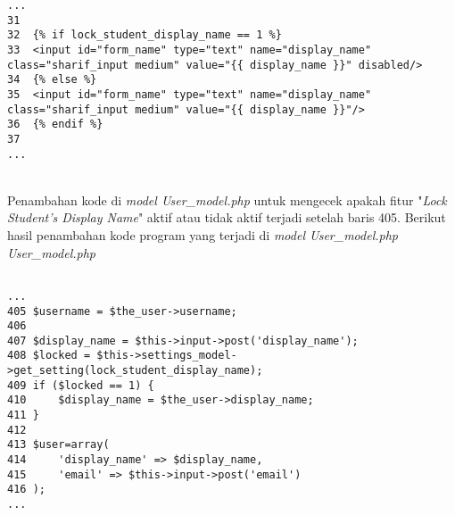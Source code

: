 \begin{lstlisting}[basicstyle=\ttfamily, frame=single,
columns=fullflexible, keepspaces=true, breaklines=true]
...
31
32	{% if lock_student_display_name == 1 %}
33	<input id="form_name" type="text" name="display_name" class="sharif_input medium" value="{{ display_name }}" disabled/>
34	{% else %}
35	<input id="form_name" type="text" name="display_name" class="sharif_input medium" value="{{ display_name }}"/>
36	{% endif %}
37
...
\end{lstlisting}
~\\
Penambahan kode di \textit{model User\_model.php} untuk mengecek apakah fitur "\textit{Lock Student's Display Name}" aktif atau tidak aktif terjadi setelah baris 405. Berikut hasil penambahan kode program yang terjadi di \textit{model User\_model.php}
\textit{User\_model.php}
\begin{lstlisting}[basicstyle=\ttfamily, frame=single,
columns=fullflexible, keepspaces=true, breaklines=true]

...
405	$username = $the_user->username;
406
407	$display_name = $this->input->post('display_name');
408	$locked = $this->settings_model->get_setting(lock_student_display_name);
409	if ($locked == 1) {
410		$display_name = $the_user->display_name;
411	}
412	
413	$user=array(
414		'display_name' => $display_name,
415		'email' => $this->input->post('email')
416	);
...
\end{lstlisting}
